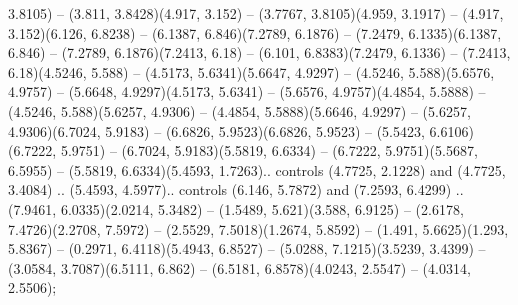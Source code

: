 3.8105) -- (3.811, 3.8428)(4.917, 3.152) -- (3.7767, 3.8105)(4.959, 3.1917) -- (4.917, 3.152)(6.126, 6.8238) -- (6.1387, 6.846)(7.2789, 6.1876) -- (7.2479, 6.1335)(6.1387, 6.846) -- (7.2789, 6.1876)(7.2413, 6.18) -- (6.101, 6.8383)(7.2479, 6.1336) -- (7.2413, 6.18)(4.5246, 5.588) -- (4.5173, 5.6341)(5.6647, 4.9297) -- (4.5246, 5.588)(5.6576, 4.9757) -- (5.6648, 4.9297)(4.5173, 5.6341) -- (5.6576, 4.9757)(4.4854, 5.5888) -- (4.5246, 5.588)(5.6257, 4.9306) -- (4.4854, 5.5888)(5.6646, 4.9297) -- (5.6257, 4.9306)(6.7024, 5.9183) -- (6.6826, 5.9523)(6.6826, 5.9523) -- (5.5423, 6.6106)(6.7222, 5.9751) -- (6.7024, 5.9183)(5.5819, 6.6334) -- (6.7222, 5.9751)(5.5687, 6.5955) -- (5.5819, 6.6334)(5.4593, 1.7263).. controls (4.7725, 2.1228) and (4.7725, 3.4084) .. (5.4593, 4.5977).. controls (6.146, 5.7872) and (7.2593, 6.4299) .. (7.9461, 6.0335)(2.0214, 5.3482) -- (1.5489, 5.621)(3.588, 6.9125) -- (2.6178, 7.4726)(2.2708, 7.5972) -- (2.5529, 7.5018)(1.2674, 5.8592) -- (1.491, 5.6625)(1.293, 5.8367) -- (0.2971, 6.4118)(5.4943, 6.8527) -- (5.0288, 7.1215)(3.5239, 3.4399) -- (3.0584, 3.7087)(6.5111, 6.862) -- (6.5181, 6.8578)(4.0243, 2.5547) -- (4.0314, 2.5506);




